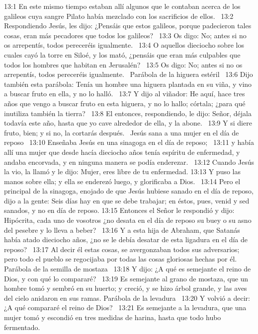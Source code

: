 13:1 En este mismo tiempo estaban allí algunos que le contaban acerca de los galileos cuya sangre Pilato había mezclado con los sacrificios de ellos.  
13:2 Respondiendo Jesús, les dijo: ¿Pensáis que estos galileos, porque padecieron tales cosas, eran más pecadores que todos los galileos?  
13:3 Os digo: No; antes si no os arrepentís, todos pereceréis igualmente.  
13:4 O aquellos dieciocho sobre los cuales cayó la torre en Siloé, y los mató, ¿pensáis que eran más culpables que todos los hombres que habitan en Jerusalén?  
13:5 Os digo: No; antes si no os arrepentís, todos pereceréis igualmente.  
Parábola de la higuera estéril  
13:6 Dijo también esta parábola: Tenía un hombre una higuera plantada en su viña, y vino a buscar fruto en ella, y no lo halló.  
13:7 Y dijo al viñador: He aquí, hace tres años que vengo a buscar fruto en esta higuera, y no lo hallo; córtala; ¿para qué inutiliza también la tierra?  
13:8 El entonces, respondiendo, le dijo: Señor, déjala todavía este año, hasta que yo cave alrededor de ella, y la abone.  
13:9 Y si diere fruto, bien; y si no, la cortarás después.  
Jesús sana a una mujer en el día de reposo  
13:10 Enseñaba Jesús en una sinagoga en el día de reposo;  
13:11 y había allí una mujer que desde hacía dieciocho años tenía espíritu de enfermedad, y andaba encorvada, y en ninguna manera se podía enderezar.  
13:12 Cuando Jesús la vio, la llamó y le dijo: Mujer, eres libre de tu enfermedad. 
13:13 Y puso las manos sobre ella; y ella se enderezó luego, y glorificaba a Dios.  
13:14 Pero el principal de la sinagoga, enojado de que Jesús hubiese sanado en el día de reposo, dijo a la gente: Seis días hay en que se debe trabajar; en éstos, pues, venid y sed sanados, y no en día de reposo. 
13:15 Entonces el Señor le respondió y dijo: Hipócrita, cada uno de vosotros ¿no desata en el día de reposo su buey o su asno del pesebre y lo lleva a beber?  
13:16 Y a esta hija de Abraham, que Satanás había atado dieciocho años, ¿no se le debía desatar de esta ligadura en el día de reposo?  
13:17 Al decir él estas cosas, se avergonzaban todos sus adversarios; pero todo el pueblo se regocijaba por todas las cosas gloriosas hechas por él.  
Parábola de la semilla de mostaza   
13:18 Y dijo: ¿A qué es semejante el reino de Dios, y con qué lo compararé?  
13:19 Es semejante al grano de mostaza, que un hombre tomó y sembró en su huerto; y creció, y se hizo árbol grande, y las aves del cielo anidaron en sus ramas. 
Parábola de la levadura   
13:20 Y volvió a decir: ¿A qué compararé el reino de Dios?  
13:21 Es semejante a la levadura, que una mujer tomó y escondió en tres medidas de harina, hasta que todo hubo fermentado.  
